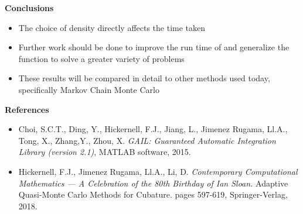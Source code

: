\documentclass[final,mathserif]{beamer}
\newcommand{\blue}[1]{{\color{myblue}#1}}
\renewcommand{\blue}{\textcolor{blue!80!black}}
\begin{document}
\begin{frame}[fragile]
\begin{columns}[t]
\begin{column}{.31\linewidth}
\begin{block}{\Large \textbf{\blue {Conclusions}}}
\begin{itemize}
\item The choice of density directly affects the time taken 

\item Further work should be done to improve the run time of  and generalize the function to solve a greater variety of problems

\item These results will be compared in detail to other methods used today, specifically Markov Chain Monte Carlo
\end{itemize}

\end{block}

\bigskip

\begin{block}{\Large \textbf{\blue {References}}}

\vspace{.1in}
\begin{itemize}
\item Choi, S.C.T., Ding, Y., Hickernell, F.J., Jiang, L., Jimenez Rugama,
Ll.A., Tong, X., Zhang,Y., Zhou, X. \emph{{GAIL}:
  {G}uaranteed {A}utomatic {I}ntegration {L}ibrary (version 2.1)}, MATLAB
  software, 2015.

\item Hickernell, F.J., Jimenez Rugama, Ll.A., Li, D. \textit{Contemporary Computational Mathematics --- A Celebration of the 80th Birthday of Ian Sloan.}  Adaptive Quasi-Monte Carlo Methods for Cubature. pages 597-619, Springer-Verlag, 2018.
\end{itemize}
\end{block}

\end{column}
\end{columns}

\end{frame}
\end{document}
